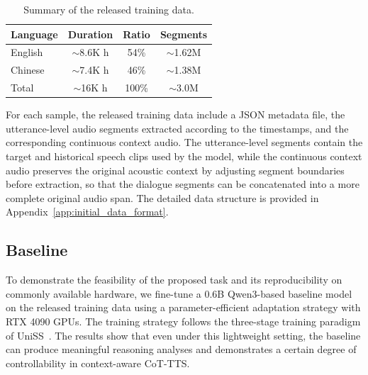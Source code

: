 \documentclass[a4paper]{article}
\begin{document}
\begin{table}[h]
\caption{Summary of the released training data.}
\label{tab:training_data_summary}
\centering
\small
\begin{tabular}{lccc}
\toprule
\textbf{Language} & \textbf{Duration} & \textbf{Ratio} & \textbf{Segments} \\
\midrule
English & $\sim$8.6K h & 54\% & $\sim$1.62M \\
Chinese & $\sim$7.4K h & 46\% & $\sim$1.38M \\
\midrule
Total & $\sim$16K h & 100\% & $\sim$3.0M \\
\bottomrule
\end{tabular}
\end{table}

\noindent For each sample, the released training data include a JSON metadata file, the utterance-level audio segments extracted according to the timestamps, and the corresponding continuous context audio. The utterance-level segments contain the target and historical speech clips used by the model, while the continuous context audio preserves the original acoustic context by adjusting segment boundaries before extraction, so that the dialogue segments can be concatenated into a more complete original audio span. The detailed data structure is provided in Appendix~\ref{app:initial_data_format}.


\subsection{Baseline}

To demonstrate the feasibility of the proposed task and its reproducibility on commonly available hardware, we fine-tune a 0.6B Qwen3-based baseline model on the released training data using a parameter-efficient adaptation strategy with RTX 4090 GPUs. The training strategy follows the three-stage training paradigm of UniSS~\cite{cheng2025uniss}. The results show that even under this lightweight setting, the baseline can produce meaningful reasoning analyses and demonstrates a certain degree of controllability in context-aware CoT-TTS.\\ 
\end{document}
